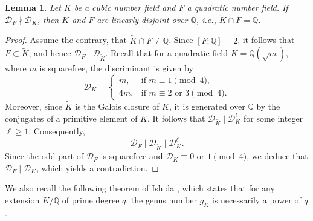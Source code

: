 \documentclass[11pt,reqno]{amsart}
\newcommand{\Q}{\mathbb{Q}}
\newcommand{\cD}{\mathcal{D}}
\newtheorem{lemma}[theorem]{Lemma}
\theoremstyle{definition}
\theoremstyle{remark}
\begin{document}
\begin{lemma}\label{disjointness}
   Let $K$ be a cubic number field and $F$ a quadratic number field. If  $ \cD_F \nmid \cD_K$, then $ K $ and $ F $ are linearly disjoint over $ \mathbb{Q} $, i.e., $ \widetilde{K} \cap F = \mathbb{Q} $.
\end{lemma}

\begin{proof}
Assume the contrary, that $ \widetilde{K} \cap F \neq \mathbb{Q} $. Since $[F:\mathbb{Q}] = 2$, it follows that $F \subset \widetilde{K}$, and hence $ \cD_F \mid \cD_{\widetilde{K}} $. Recall that for a quadratic field $K=\Q(\sqrt{m})$, where $m$ is squarefree, the discriminant is given by
\begin{equation*}
\cD_K =
\begin{cases}
m, & \text{if } m \equiv 1 \pmod{4}, \\
4m, & \text{if } m \equiv 2 \text{ or } 3 \pmod{4}.
\end{cases}
\end{equation*}
Moreover, since $ \widetilde{K} $ is the Galois closure of $K$, it is generated over $\mathbb{Q}$ by the conjugates of a primitive element of $K$. It follows that $ \cD_{\widetilde{K}} \mid \cD_K^{\ell} $ for some integer $\ell \geq 1$. Consequently,
$$ 
    \cD_F \mid \cD_{\widetilde{K}} \mid \cD_K^{\ell}. 
$$
Since the odd part of $\cD_F$ is squarefree and $\cD_K \equiv 0 \text{ or } 1 \pmod{4}$, we deduce that $\cD_F \mid \cD_K$, which yields a contradiction.
\end{proof}
\medskip

We also recall the following theorem of Ishida \cite{Ish75}, which states that for any extension $K/\mathbb{Q}$ of prime degree $q$, the genus number $g_K$ is necessarily a power of $q$.
\end{document}
